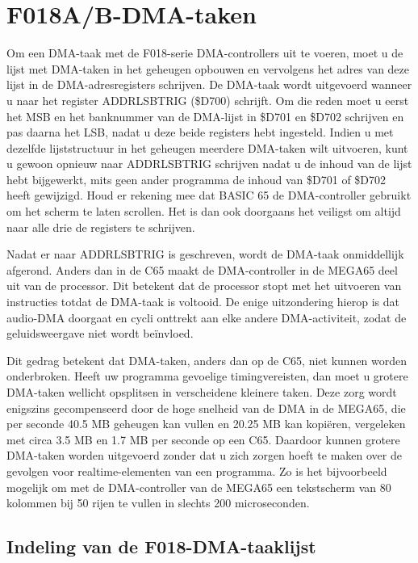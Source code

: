 \section{F018A/B-DMA-taken}

Om een DMA-taak met de F018-serie DMA-controllers uit te voeren, moet u de lijst met DMA-taken in het geheugen opbouwen en vervolgens het adres van deze lijst in de DMA-adresregisters schrijven. De DMA-taak wordt uitgevoerd wanneer u naar het register ADDRLSBTRIG (\$D700) schrijft. Om die reden moet u eerst het MSB en het banknummer van de DMA-lijst in \$D701 en \$D702 schrijven en pas daarna het LSB, nadat u deze beide registers hebt ingesteld. Indien u met dezelfde lijststructuur in het geheugen meerdere DMA-taken wilt uitvoeren, kunt u gewoon opnieuw naar ADDRLSBTRIG schrijven nadat u de inhoud van de lijst hebt bijgewerkt, mits geen ander programma de inhoud van \$D701 of \$D702 heeft gewijzigd. Houd er rekening mee dat BASIC 65 de DMA-controller gebruikt om het scherm te laten scrollen. Het is dan ook doorgaans het veiligst om altijd naar alle drie de registers te schrijven.

Nadat er naar ADDRLSBTRIG is geschreven, wordt de DMA-taak onmiddellijk afgerond. Anders dan in de C65 maakt de DMA-controller in de MEGA65 deel uit van de processor. Dit betekent dat de processor stopt met het uitvoeren van instructies totdat de DMA-taak is voltooid. De enige uitzondering hierop is dat audio-DMA doorgaat en cycli onttrekt aan elke andere DMA-activiteit, zodat de geluidsweergave niet wordt beïnvloed.

Dit gedrag betekent dat DMA-taken, anders dan op de C65, niet kunnen worden onderbroken. Heeft uw programma gevoelige timingvereisten, dan moet u grotere DMA-taken wellicht opsplitsen in verscheidene kleinere taken. Deze zorg wordt enigszins gecompenseerd door de hoge snelheid van de DMA in de MEGA65, die per seconde 40.5 MB geheugen kan vullen en 20.25 MB kan kopiëren, vergeleken met circa 3.5 MB en 1.7 MB per seconde op een C65. Daardoor kunnen grotere DMA-taken worden uitgevoerd zonder dat u zich zorgen hoeft te maken over de gevolgen voor realtime-elementen van een programma. Zo is het bijvoorbeeld mogelijk om met de DMA-controller van de MEGA65 een tekstscherm van 80 kolommen bij 50 rijen te vullen in slechts 200 microseconden.

\subsection{Indeling van de F018-DMA-taaklijst}

